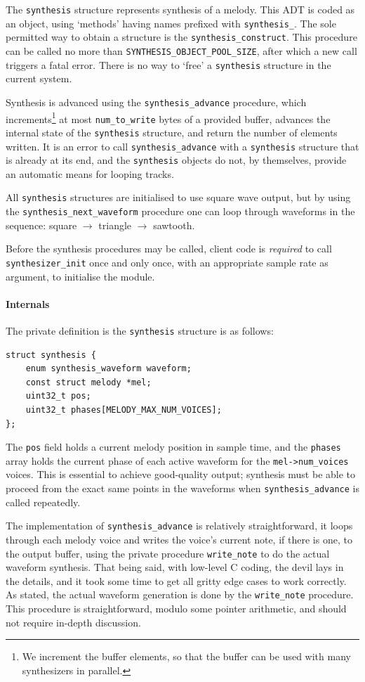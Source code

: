 \documentclass[a4paper,9pt]{article}
\newcommand{\isrc}[1]{\texttt{#1}}
\newcommand{\oaoo}{once and only once}
\begin{document}
The \isrc{synthesis} structure represents synthesis of a melody. This ADT is
coded as an object, using `methods' having names prefixed with
\isrc{synthesis\_}. The sole permitted way to obtain a structure is the
\isrc{synthesis\_construct}.  This procedure can be called no more than
\isrc{SYNTHESIS\_OBJECT\_POOL\_SIZE}, after which a new call triggers a fatal
error. There is no way to `free' a \isrc{synthesis} structure in the current
system.

Synthesis is advanced using the \isrc{synthesis\_advance} procedure, which
increments\footnote{We increment the buffer elements, so that the buffer can
be used with many synthesizers in parallel.} at most \isrc{num\_to\_write}
bytes of a provided buffer, advances the internal state of the
\isrc{synthesis} structure, and return the number of elements written.  It is
an error to call \isrc{synthesis\_advance} with a \isrc{synthesis} structure
that is already at its end, and the \isrc{synthesis} objects do not, by
themselves, provide an automatic means for looping tracks. 

All \isrc{synthesis} structures are initialised to use square wave output, but
by using the \isrc{synthesis\_next\_waveform} procedure one can loop through
waveforms in the sequence: square $\rightarrow$ triangle $\rightarrow$
sawtooth.

Before the synthesis procedures may be called, client code is \emph{required}
to call \isrc{synthesizer\_init} \oaoo, with an appropriate sample rate as
argument, to initialise the module.

\paragraph{Internals}
The private definition is the \isrc{synthesis} structure is as follows:
\begin{lstlisting}
struct synthesis {
    enum synthesis_waveform waveform;
    const struct melody *mel;
    uint32_t pos;
    uint32_t phases[MELODY_MAX_NUM_VOICES];
};
\end{lstlisting}
The \isrc{pos} field holds a current melody position in sample time, and the
\isrc{phases} array holds the current phase of each active waveform for the
\isrc{mel->num\_voices} voices. This is essential to achieve good-quality
output; synthesis must be able to proceed from the exact same points in the
waveforms when \isrc{synthesis\_advance} is called repeatedly. 

The implementation of \isrc{synthesis\_advance} is relatively straightforward,
it loops through each melody voice and writes the voice's current note, if
there is one, to the output buffer, using the private procedure
\isrc{write\_note} to do the actual waveform synthesis. That being said, with
low-level C coding, the devil lays in the details, and it took some time to
get all gritty edge cases to work correctly. 
As stated, the actual waveform generation is done by the \isrc{write\_note}
procedure. This procedure is straightforward, modulo some pointer arithmetic,
and should not require in-depth discussion.
\end{document}
